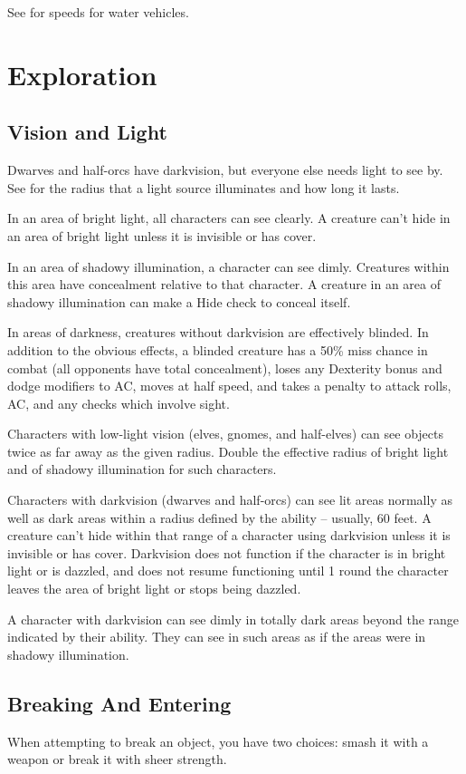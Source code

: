  See  for speeds for water vehicles.

\section{Exploration}
\subsection{Vision and Light}
Dwarves and half-orcs have darkvision, but everyone else needs light to see by. See  for the radius that a light source illuminates and how long it lasts.

In an area of bright light, all characters can see clearly. A creature can't hide in an area of bright light unless it is invisible or has cover.

In an area of shadowy illumination, a character can see dimly. Creatures within this area have concealment relative to that character. A creature in an area of shadowy illumination can make a Hide check to conceal itself.

In areas of darkness, creatures without darkvision are effectively blinded. In addition to the obvious effects, a blinded creature has a 50\% miss chance in combat (all opponents have total concealment), loses any Dexterity bonus and dodge modifiers to AC, moves at half speed, and takes a  penalty to attack rolls, AC, and any checks which involve sight.

Characters with low-light vision (elves, gnomes, and half-elves) can see objects twice as far away as the given radius. Double the effective radius of bright light and of shadowy illumination for such characters.

Characters with darkvision (dwarves and half-orcs) can see lit areas normally as well as dark areas within a radius defined by the ability -- usually, 60 feet. A creature can't hide within that range of a character using darkvision unless it is invisible or has cover. Darkvision does not function if the character is in bright light or is dazzled, and does not resume functioning until 1 round the character leaves the area of bright light or stops being dazzled.

A character with darkvision can see dimly in totally dark areas beyond the range indicated by their ability. They can see in such areas as if the areas were in shadowy illumination.

\subsection{Breaking And Entering}
When attempting to break an object, you have two choices: smash it with a weapon or break it with sheer strength.

